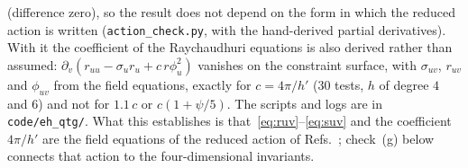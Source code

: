 \documentclass[11pt]{article}
\begin{document}
(difference zero), so the result does not depend on the form in which the reduced action is written (\texttt{action\_check.py}, with the hand-derived partial derivatives). With it the coefficient of the Raychaudhuri equations is also derived rather than assumed: $\partial_v(r_{uu}-\sigma_ur_u+c\,r\phi_u^{2})$ vanishes on the constraint surface, with $\sigma_{uv}$, $r_{uv}$ and $\phi_{uv}$ from the field equations, exactly for $c=4\pi/h'$ ($30$ tests, $h$ of degree $4$ and $6$) and not for $1.1\,c$ or $c(1+\psi/5)$. The scripts and logs are in \texttt{code/eh\_qtg/}. What this establishes is that~\eqref{eq:ruv}--\eqref{eq:suv} and the coefficient $4\pi/h'$ are the field equations of the reduced action of Refs.~\cite{BuenoCanoHennigarMurcia2025,BorissovaCarballoRubio2026}; check~(g) below connects that action to the four-dimensional invariants.
\end{document}

